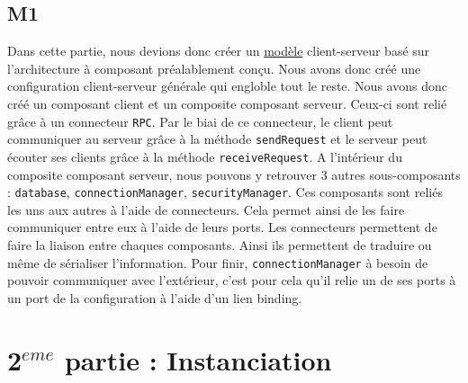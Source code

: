 \documentclass[11pt, a4paper, notitlepage]{article}
\newcommand\tab{\hspace*{10mm}}
\begin{document}
\subsection*{M1}
\tab Dans cette partie, nous devions donc créer un \href{run:../img/Asa_M1.png}{modèle} client-serveur basé sur l'architecture à composant préalablement conçu. Nous avons donc créé une configuration client-serveur générale qui engloble tout le reste. Nous avons donc créé un composant client et un composite composant serveur. Ceux-ci sont relié grâce à un connecteur \verb"RPC". Par le biai de ce connecteur, le client peut communiquer au serveur grâce à la méthode \verb"sendRequest" et le serveur peut écouter ses clients grâce à la méthode \verb"receiveRequest". A l'intérieur du composite composant serveur, nous pouvons y retrouver 3 autres sous-composants : \verb"database", \verb"connectionManager", \verb"securityManager". Ces composants sont reliés les uns aux autres à l'aide de connecteurs. Cela permet ainsi de les faire communiquer entre eux à l'aide de leurs ports. Les connecteurs permettent de faire la liaison entre chaques composants. Ainsi ils permettent de traduire ou même de sérialiser l'information. Pour finir, \verb"connectionManager" à besoin de pouvoir communiquer avec l'extérieur, c'est pour cela qu'il relie un de ses ports à un port de la configuration à l'aide d'un lien binding.

\section*{2$^{eme}$ partie : Instanciation}
\end{document}
